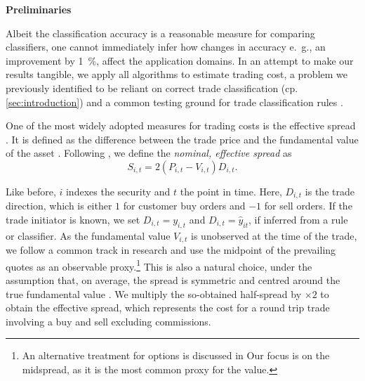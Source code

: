 \textbf{Preliminaries}


Albeit the classification accuracy is a reasonable measure for comparing classifiers, one cannot immediately infer how changes in accuracy e.~g., an improvement by \SI{1}{\percent}, affect the application domains. In an attempt to make our results tangible, we apply all algorithms to estimate trading cost, a problem we previously identified to be reliant on correct trade classification (cp. \cref{sec:introduction}) and a common testing ground for trade classification rules \autocites[cp.][541]{ellisAccuracyTradeClassification2000}[][569]{finucaneDirectTestMethods2000}[][271--278]{petersonEvaluationBiasesExecution2003}[][896--897]{savickasInferringDirectionOption2003}.

One of the most widely adopted measures for trading costs is the effective spread \autocite[][112]{Piwowar_2006}. It is defined as the difference between the trade price and the fundamental value of the asset \autocite[][238--239]{bessembinderIssuesAssessingTrade2003}. Following \textcite[][238--239]{bessembinderIssuesAssessingTrade2003}, we define the \emph{nominal, effective spread} as
\begin{equation}
    S_{i,t} = 2 (P_{i,t} - V_{i,t}) D_{i,t}.
    \label{eq:effective-spread}
\end{equation}

Like before, $i$ indexes the security and $t$ the point in time. Here, $D_{i,t}$ is the trade direction, which is either $1$ for customer buy orders and $-1$ for sell orders. If the trade initiator is known, we set $D_{i,t} = y_{i,t}$ and $D_{i,t}=\hat{y}_{it}$, if inferred from a rule or classifier. As the fundamental value $V_{i,t}$ is unobserved at the time of the trade, we follow a common track in research and use the midpoint of the prevailing quotes as an observable proxy.\footnote{An alternative treatment for options is discussed in \textcite[][4975--4976]{muravyevOptionsTradingCosts2020} Our focus is on the midspread, as it is the most common proxy for the value.} This is also a natural choice, under the assumption that, on average, the spread is symmetric and centred around the true fundamental value \autocite[][1018]{leeMarketIntegrationPrice1993}. We multiply the so-obtained half-spread by $\times 2$ to obtain the effective spread, which represents the cost for a round trip trade involving a buy and sell excluding commissions.

